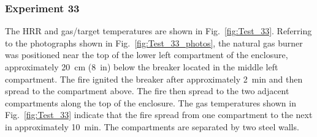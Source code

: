 \clearpage

\subsubsection{Experiment 33}

The HRR and gas/target temperatures are shown in Fig.~\ref{fig:Test_33}. Referring to the photographs shown in Fig.~\ref{fig:Test_33_photos}, the natural gas burner was positioned near the top of the lower left compartment of the enclosure, approximately 20~cm (8~in) below the breaker located in the middle left compartment. The fire ignited the breaker after approximately 2~min and then spread to the compartment above. The fire then spread to the two adjacent compartments along the top of the enclosure. The gas temperatures shown in Fig.~\ref{fig:Test_33} indicate that the fire spread from one compartment to the next in approximately 10~min. The compartments are separated by two steel walls.

